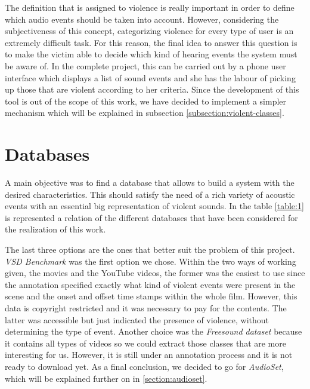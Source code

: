 	The definition that is assigned to violence is really important in order to define which audio events should be taken into account. However, considering the subjectiveness of this concept, categorizing violence for every type of user is an extremely difficult task. For this reason, the final idea to answer this question is to make the victim able to decide which kind of hearing events the system must be aware of. In the complete project, this can be carried out by a phone user interface which displays a list of sound events and she has the labour of picking up those that are violent according to her criteria. Since the development of this tool is out of the scope of this work, we have decided to implement a simpler mechanism which will be explained in subsection \ref{subsection:violent-classes}.
		

\section{Databases}

	A main objective was to find a database that allows to build a system with the desired characteristics. This should satisfy the need of a rich variety of acoustic events with an essential big representation of violent sounds. In the table \ref{table:1} is represented a relation of the different databases that have been considered for the realization of this work.
	
	
	
	The last three options are the ones that better suit the problem of this project. \textit{VSD Benchmark} was the first option we chose. Within the two ways of working given, the movies and the YouTube videos, the former was the easiest to use since the annotation specified exactly what kind of violent events were present in the scene and the onset and offset time stamps within the whole film. However, this data is copyright restricted and it was necessary to pay for the contents. The latter was accessible but just indicated the presence of violence, without determining the type of event. Another choice was the \textit{Freesound dataset} because it contains all types of videos so we could extract those classes that are more interesting for us. However, it is still under an annotation process and it is not ready to download yet. As a final conclusion, we decided to go for \textit{AudioSet}, which will be explained further on in \ref{section:audioset}.
	
	
